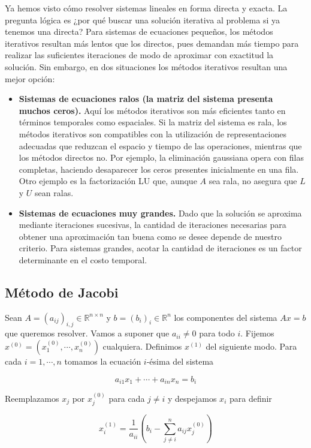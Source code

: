 Ya hemos visto cómo resolver sistemas lineales en forma directa y exacta. La pregunta lógica es ¿por qué buscar una solución iterativa al problema si ya tenemos una directa? Para sistemas de ecuaciones pequeños, los métodos iterativos resultan más lentos que los directos, pues demandan más tiempo para realizar las suficientes iteraciones de modo de aproximar con exactitud la solución. Sin embargo, en dos situaciones los métodos iterativos resultan una mejor opción:
\begin{itemize}
\item \textbf{Sistemas de ecuaciones ralos (la matriz del sistema presenta muchos ceros).} Aquí los métodos iterativos son más eficientes tanto en términos temporales como espaciales. Si la matriz del sistema es rala, los métodos iterativos son compatibles con la utilización de representaciones adecuadas que reduzcan el espacio y tiempo de las operaciones, mientras que los métodos directos no. Por ejemplo, la eliminación gaussiana opera con filas completas, haciendo desaparecer los ceros presentes inicialmente en una fila. Otro ejemplo es la factorización LU que, aunque $A$ sea rala, no asegura que $L$ y $U$ sean ralas.

\item \textbf{Sistemas de ecuaciones muy grandes.} Dado que la solución se aproxima mediante iteraciones sucesivas, la cantidad de iteraciones necesarias para obtener una aproximación tan buena como se desee depende de nuestro criterio. Para sistemas grandes, acotar la cantidad de iteraciones es un factor determinante en el costo temporal.
\end{itemize}

\subsection{Método de Jacobi}

Sean $A = (a_{ij})_{i, j} \in \mathbb{R}^{n \times n}$ y $b = (b_i)_i \in \mathbb{R}^n$ los componentes del sistema $Ax = b$ que queremos resolver. Vamos a suponer que $a_{ii} \neq 0$ para todo $i$. Fijemos $x^{(0)} = (x_1^{(0)}, \cdots, x_n^{(0)})$ cualquiera. Definimos $x^{(1)}$ del siguiente modo. Para cada $i = 1, \cdots, n$ tomamos la ecuación $i$-ésima del sistema

\[a_{i1} x_1 + \cdots + a_{in} x_n = b_i\]

Reemplazamos $x_j$ por $x_j^{(0)}$ para cada $j \neq i$ y despejamos $x_i$ para definir

\[x_i^{(1)} = \frac{1}{a_{ii}}\left(b_i - \sum_{j \neq i}^n a_{ij}x_j^{(0)}\right)\]

